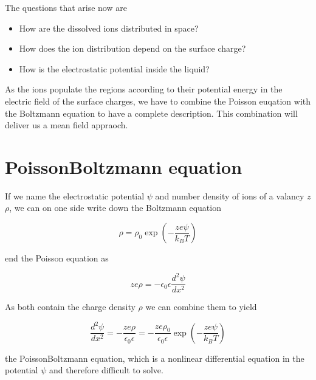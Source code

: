 \documentclass[letterpaper,10pt,english]{sphinxmanual}
\begin{document}
\sphinxAtStartPar
The questions that arise now are
\begin{itemize}
\item {} 
\sphinxAtStartPar
How are the dissolved ions distributed in space?

\item {} 
\sphinxAtStartPar
How does the ion distribution depend on the surface charge?

\item {} 
\sphinxAtStartPar
How is the electrostatic potential inside the liquid?

\end{itemize}

\sphinxAtStartPar
As the ions populate the regions according to their potential energy in the electric field of the surface charges, we have to combine the Poisson euqation with the Boltzmann equation to have a complete description. This combination will deliver us a mean field appraoch.


\section{Poisson\sphinxhyphen{}Boltzmann equation}
\label{\detokenize{notebooks/L9/1_Electric_Double_Layer:Poisson-Boltzmann-equation}}
\sphinxAtStartPar
If we name the electrostatic potential \(\psi\) and number density of ions of a valancy \(z\) \(\rho\), we can on one side write down the Boltzmann equation

\sphinxAtStartPar
\begin{equation}
\rho=\rho_0 \exp\left ( -\frac{z e\psi}{k_B T}\right)\tag{Boltzmann equation}
\end{equation}

\sphinxAtStartPar
end the Poisson equation as

\sphinxAtStartPar
\begin{equation}
ze\rho =-\epsilon_0 \epsilon \frac{d^{2}\psi}{dx^2}\tag{Poisson equation}
\end{equation}

\sphinxAtStartPar
As both contain the charge density \(\rho\) we can combine them to yield

\sphinxAtStartPar
\begin{equation}
\frac{d^2\psi}{dx^2} = -\frac{ze\rho}{\epsilon_0 \epsilon} =-\frac{ze \rho_0}{\epsilon_0 \epsilon}\exp\left ( -\frac{z e\psi}{k_B T}\right)\tag{Poisson-Boltzmann equation}
\end{equation}

\sphinxAtStartPar
the Poisson\sphinxhyphen{}Boltzmann equation, which is a non\sphinxhyphen{}linear differential equation in the potential \(\psi\) and therefore difficult to solve.
\end{document}
